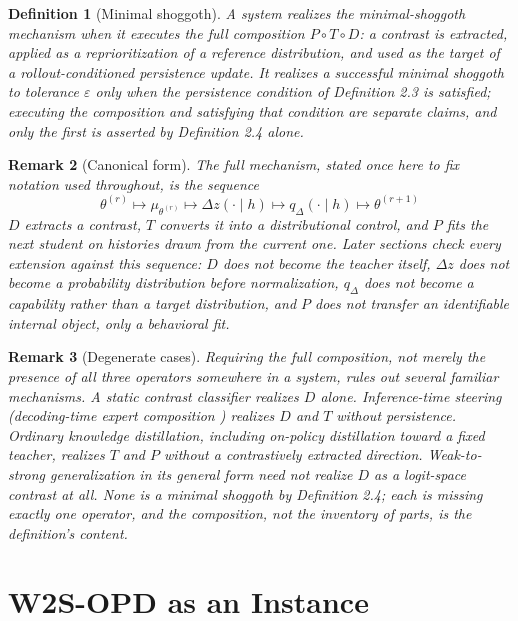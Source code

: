 \documentclass[11pt]{article}
\newtheorem{definition}{Definition}[section]
\newtheorem{remark}[definition]{Remark}
\begin{document}
\begin{definition}[Minimal shoggoth]
A system realizes the minimal-shoggoth mechanism when it executes the full composition $P \circ T \circ D$: a contrast is extracted, applied as a reprioritization of a reference distribution, and used as the target of a rollout-conditioned persistence update. It realizes a \emph{successful} minimal shoggoth to tolerance $\varepsilon$ only when the persistence condition of Definition 2.3 is satisfied; executing the composition and satisfying that condition are separate claims, and only the first is asserted by Definition 2.4 alone.
\end{definition}

\begin{remark}[Canonical form]
The full mechanism, stated once here to fix notation used throughout, is the sequence
\[
\theta^{(r)} \longmapsto \mu_{\theta^{(r)}} \longmapsto \Delta z(\cdot \mid h) \longmapsto q_\Delta(\cdot \mid h) \longmapsto \theta^{(r+1)}
\]
$D$ extracts a contrast, $T$ converts it into a distributional control, and $P$ fits the next student on histories drawn from the current one. Later sections check every extension against this sequence: $D$ does not become the teacher itself, $\Delta z$ does not become a probability distribution before normalization, $q_\Delta$ does not become a capability rather than a target distribution, and $P$ does not transfer an identifiable internal object, only a behavioral fit.
\end{remark}

\begin{remark}[Degenerate cases]
Requiring the full composition, not merely the presence of all three operators somewhere in a system, rules out several familiar mechanisms. A static contrast classifier realizes $D$ alone. Inference-time steering (decoding-time expert composition \cite{liu_dexperts_2021}) realizes $D$ and $T$ without persistence. Ordinary knowledge distillation, including on-policy distillation \cite{agarwal_opd_2024} toward a fixed teacher, realizes $T$ and $P$ without a contrastively extracted direction. Weak-to-strong generalization \cite{burns_w2s_2023} in its general form need not realize $D$ as a logit-space contrast at all. None is a minimal shoggoth by Definition 2.4; each is missing exactly one operator, and the composition, not the inventory of parts, is the definition's content.
\end{remark}

\section{W2S-OPD as an Instance}
\end{document}

